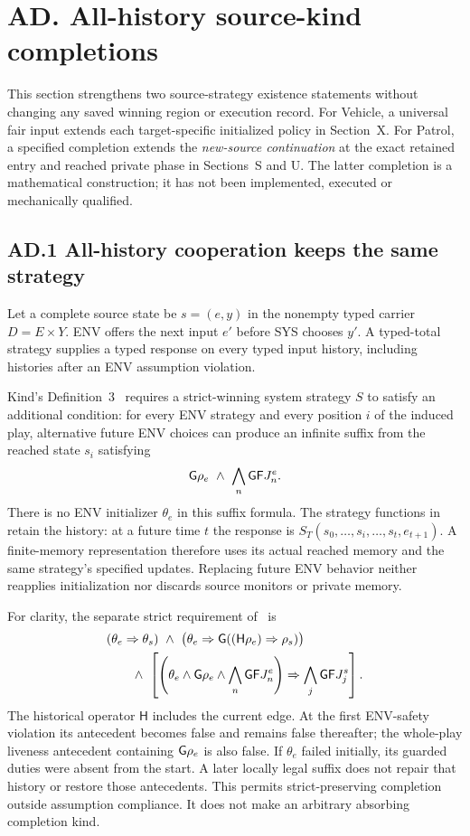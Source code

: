 \clearpage
\section*{AD. All-history source-kind completions}
\label{supp:r7-all-history-kind}
\setcounter{lemma}{0}
\renewcommand{\thelemma}{AD.\arabic{lemma}}
\renewcommand{\theHlemma}{AD.\arabic{lemma}}

This section strengthens two source-strategy existence statements without
changing any saved winning region or execution record. For Vehicle, a universal
fair input extends each target-specific initialized policy in Section~X.
For Patrol, a specified completion extends the \emph{new-source continuation}
at the exact retained entry and reached private phase in Sections~S and U.
The latter completion is a mathematical construction; it has not been
implemented, executed or mechanically qualified.

\subsection*{AD.1 All-history cooperation keeps the same strategy}
\label{supp:r7-kind-definition}
Let a complete source state be $s=(e,y)$ in the nonempty typed carrier
$D=E\times Y$. ENV offers the next input $e'$ before SYS chooses $y'$.
A typed-total strategy supplies a typed response on every typed input history,
including histories after an ENV assumption violation.

Kind's Definition~3~\cite[Def.~3, p.~4]{kind} requires a strict-winning
system strategy $S$ to satisfy an additional condition: for every ENV strategy
and every position $i$ of the induced play, alternative future ENV choices
can produce an infinite suffix from the reached state $s_i$ satisfying
\[
 \mathsf{G}\rho_e\ \land\ \bigwedge_n\mathsf{G}\mathsf{F} J^e_n .
\]
There is no ENV initializer $\theta_e$ in this suffix formula. The strategy
functions in~\cite[p.~3]{kind} retain the history: at a future time $t$ the
response is $S_T(s_0,\ldots,s_i,\ldots,s_t,e_{t+1})$.
A finite-memory representation therefore uses its actual reached memory and
the same strategy's specified updates. Replacing future ENV behavior neither
reapplies initialization nor discards source monitors or private memory.

For clarity, the separate strict requirement of~\cite[Def.~1]{kind} is
\[
\begin{aligned}
 &(\theta_e\Rightarrow\theta_s)
 \ \land\
 \bigl(\theta_e\Rightarrow
       \mathsf{G}((\mathsf H\rho_e)\Rightarrow\rho_s)\bigr)\\
 &\qquad{}\land\
 \left[
  \left(\theta_e\land\mathsf{G}\rho_e\land\bigwedge_n\mathsf{G}\mathsf{F} J^e_n\right)
  \Rightarrow\bigwedge_j\mathsf{G}\mathsf{F} J^s_j
 \right].
\end{aligned}
\]
The historical operator $\mathsf H$ includes the current edge. At the first
ENV-safety violation its antecedent becomes false and remains false thereafter;
the whole-play liveness antecedent containing $\mathsf{G}\rho_e$ is also false.
If $\theta_e$ failed initially, its guarded duties were absent from the start.
A later locally legal suffix does not repair that history or restore those
antecedents. This permits strict-preserving completion outside assumption
compliance. It does not make an arbitrary absorbing completion kind.

